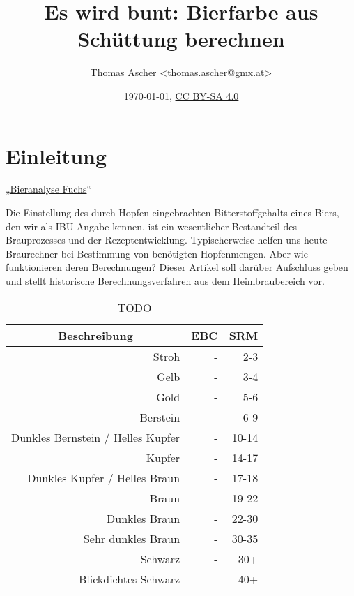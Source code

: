 \documentclass[a4paper,parskip=half]{scrartcl}
\title{Es wird bunt: Bierfarbe aus Schüttung berechnen}
\author{Thomas Ascher <thomas.ascher@gmx.at>}
\date{\today, \href{http://creativecommons.org/licenses/by-sa/4.0/}{CC BY-SA 4.0}}
\begin{document}
\maketitle

\section*{Einleitung}

„\href{https://bieranalyse.de}{Bieranalyse Fuchs}“

Die Einstellung des durch Hopfen eingebrachten Bitterstoffgehalts eines Biers, den wir als IBU-Angabe kennen, ist ein wesentlicher Bestandteil des Brauprozesses und der Rezeptentwicklung. Typischerweise helfen uns heute Braurechner bei Bestimmung von benötigten Hopfenmengen. Aber wie funktionieren deren Berechnungen? Dieser Artikel soll darüber Aufschluss geben und stellt historische Berechnungsverfahren aus dem Heimbraubereich vor.


\begin{table}[H]
\centering
\begin{tabular}{rrr}
\toprule
\multicolumn{1}{c}{\textbf{Beschreibung}} & \multicolumn{1}{c}{\textbf{EBC}} & \multicolumn{1}{c}{\textbf{SRM}} \\
\midrule
Stroh & - & 2-3 \\
Gelb & - & 3-4 \\
Gold & - & 5-6 \\
Berstein & - & 6-9 \\
Dunkles Bernstein / Helles Kupfer & - & 10-14 \\
Kupfer & - & 14-17 \\
Dunkles Kupfer / Helles Braun & - & 17-18 \\
Braun & - & 19-22 \\
Dunkles Braun & - & 22-30 \\
Sehr dunkles Braun & - & 30-35 \\
Schwarz & - & 30+ \\
Blickdichtes Schwarz & - & 40+ \\
\bottomrule
\end{tabular}
\caption{TODO \parencite{BJCP2015}}
\label{table:bjcpcolor}
\end{table}
\end{document}
